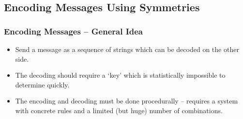 \documentclass[aspectratio=169,11pt,svgnames]{beamer}
\newcommand{\clc}{\textcolor{PolygonCyan}}
\newcommand{\clb}{\textcolor{PolygonBlue}}
\newcommand{\clo}{\textcolor{PolygonOrange}}
\begin{document}
%  
%

\subsection{Encoding Messages Using Symmetries}
\begin{frame}
 \subsectionpage
\end{frame}

\begin{frame}
 \frametitle{Encoding Messages -- General Idea}
 \begin{itemize}[label=\textbullet]
  \item Send a message as a sequence of strings which \alert{can be decoded on
   the other side}.
  \pause
  \item The decoding should require a `key' which is \alert{statistically
   impossible to determine quickly}.
  \pause
  \item The encoding and decoding must be done procedurally -- requires a system
   with concrete rules and a \alert{limited} (but huge) \alert{number of
   combinations}.
 \end{itemize}
\end{frame}
\end{document}
